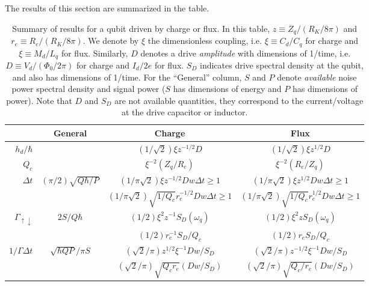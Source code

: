 
The results of this section are summarized in the table.
\begin{table*}
  \centering
  \begin{tabular}{|r|c|c|c|}
    \hline
    & General & Charge & Flux \\
    \hline \hline
    $h_d/\hbar$
      &
      & $(1/\sqrt{2}) \xi z^{-1/2} D$
      & $(1/\sqrt{2}) \xi z^{1/2} D$
      \\
    \hline
    $Q_c$
      &
      & $\xi^{-2} (Z_q/R_e)$
      & $\xi^{-2} (R_e/Z_q)$
      \\
    \hline
    $\Delta t$
      & $(\pi/2) \sqrt{Q \hbar / P}$
      & $(1/\pi\sqrt{2}) \xi z^{-1/2} D w \Delta t \geq 1$
      & $(1/\pi\sqrt{2}) \xi z^{1/2}  D w \Delta t \geq 1$
      \\
      &
      & $(1/\pi\sqrt{2}) \sqrt{1/Q_c} r_e^{-1/2} D w \Delta t \geq 1$
      & $(1/\pi\sqrt{2}) \sqrt{1/Q_c} r_e^{1/2}  D w \Delta t \geq 1$
      \\
    \hline
    $\Gamma_{\uparrow\downarrow}$
      & $2 S / Q \hbar$
      & $(1/2) \xi^2 z^{-1} S_D(\omega_q)$
      & $(1/2) \xi^2 z      S_D(\omega_q)$
      \\
      &
      & $(1/2) r_e^{-1} S_D / Q_c$
      & $(1/2) r_e      S_D / Q_c$
      \\
    \hline
    $1/\Gamma \Delta t$
      & $\sqrt{\hbar Q P}/ \pi S$
      & $(\sqrt{2}/\pi) z^{1/2}  \xi^{-1} Dw/S_D$
      & $(\sqrt{2}/\pi) z^{-1/2} \xi^{-1} Dw/S_D$
      \\
      &
      & $(\sqrt{2}/\pi) \sqrt{Q_c r_e} (Dw/S_D)$
      & $(\sqrt{2}/\pi) \sqrt{Q_c/r_e} (Dw/S_D)$
      \\
    \hline
  \end{tabular}
  \caption{Summary of results for a qubit driven by charge or flux. In this table, $z\equiv Z_q/(R_K/8\pi)$ and $r_e \equiv R_e / (R_K/8\pi)$. We denote by $\xi$ the dimensionless coupling, i.e. $\xi \equiv C_d/C_q$ for charge and $\xi \equiv M_d/L_q$ for flux. Similarly, $D$ denotes a drive \emph{amplitude} with dimensions of 1/time, i.e. $D \equiv V_d/(\Phi_0 / 2\pi)$ for charge and $I_d/2e$ for flux. $S_D$ indicates drive spectral density at the qubit, and also has dimensions of 1/time. For the ``General'' column, $S$ and $P$ denote \emph{available} noise power spectral density and signal power ($S$ has dimensions of energy and $P$ has dimensions of power). Note that $D$ and $S_D$ are not available quantities, they correspond to the current/voltage at the drive capacitor or inductor.}
\end{table*}
